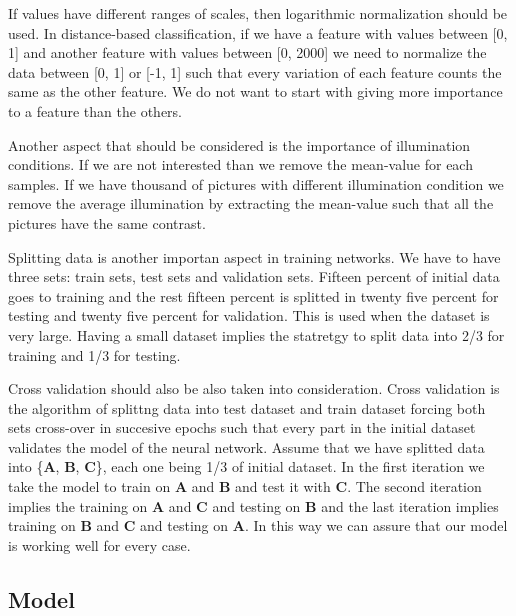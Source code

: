 If values have different ranges of scales, then logarithmic normalization should be used. In distance-based classification, if we have a feature with values between [0, 1] and another feature with values between [0, 2000] we need to normalize the data between [0, 1] or [-1, 1] such that every variation of each feature counts the same as the other feature. We do not want to start with giving more importance to a feature than the others.

Another aspect that should be considered is the importance of illumination conditions. If we are not interested than we remove the mean-value for each samples. If we have thousand of pictures with different illumination condition we remove the average illumination by extracting the mean-value such that all the pictures have the same contrast.

Splitting data is another importan aspect in training networks. We have to have three sets: train sets, test sets and validation sets. Fifteen percent of initial data goes to training and the rest fifteen percent is splitted in twenty five percent for testing and twenty five percent for validation. This is used when the dataset is very large. Having a small dataset implies the statretgy to split data into 2/3 for training and 1/3 for testing\cite{splitting}.


Cross validation\cite{cross-validation} should also be also taken into consideration. Cross validation is the algorithm of splittng data into test dataset and train dataset forcing both sets cross-over in succesive epochs such that every part in the initial dataset validates the model of the neural network. Assume that we have splitted data into \{\textbf{A}, \textbf{B}, \textbf{C}\}, each one being 1/3 of initial dataset. In the first iteration we take the model to train on \textbf{A} and \textbf{B} and test it with \textbf{C}. The second iteration implies the training on \textbf{A} and \textbf{C} and testing on \textbf{B} and the last iteration implies training on \textbf{B} and \textbf{C} and testing on \textbf{A}. In this way we can assure that our model is working well for every case.



\subsection{Model}
\label{model}


